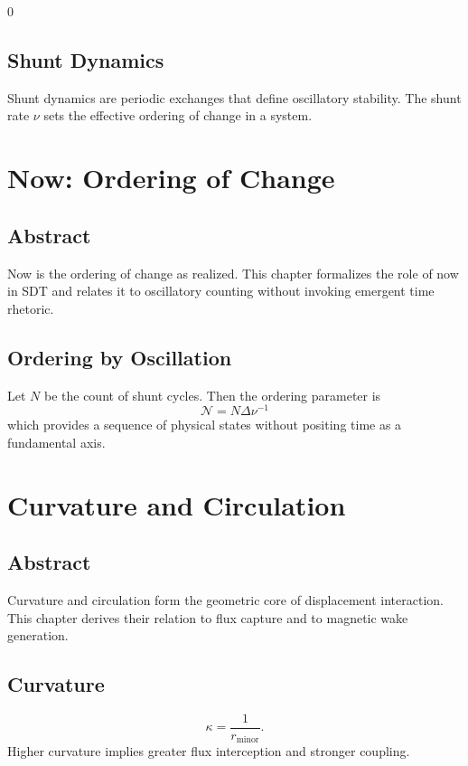 0\documentclass[12pt]{book}
\begin{document}
\section{Shunt Dynamics}
Shunt dynamics are periodic exchanges that define oscillatory stability. The shunt rate $\nu$ sets the
effective ordering of change in a system.

\chapter{Now: Ordering of Change}

\section*{Abstract}
Now is the ordering of change as realized. This chapter formalizes the role of now in SDT and relates it
to oscillatory counting without invoking emergent time rhetoric.

\section{Ordering by Oscillation}
Let $N$ be the count of shunt cycles. Then the ordering parameter is
\begin{equation}
\mathcal{N} = N \Delta \nu^{-1}
\end{equation}
which provides a sequence of physical states without positing time as a fundamental axis.

\chapter{Curvature and Circulation}

\section*{Abstract}
Curvature and circulation form the geometric core of displacement interaction. This chapter derives
their relation to flux capture and to magnetic wake generation.

\section{Curvature}
\begin{equation}
\kappa = \frac{1}{r_{\text{minor}}}.
\end{equation}
Higher curvature implies greater flux interception and stronger coupling.
\end{document}
